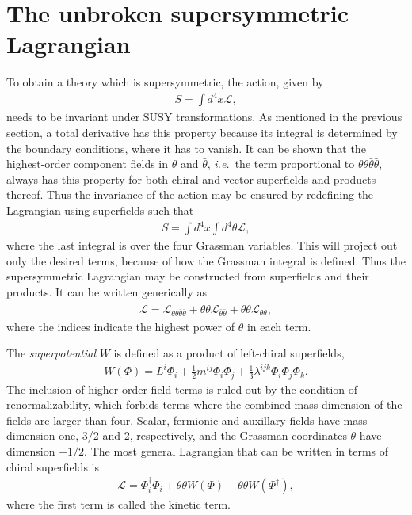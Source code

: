 \documentclass[twoside,english]{uiofysmaster}
\begin{document}
\section{The unbroken supersymmetric Lagrangian}
\label{sec:unbroken_susy}
To obtain a theory which is supersymmetric, the action, given by
\begin{align}
 	S = \int d^4 x \mathcal{L},
 \end{align}
 needs to be invariant under SUSY transformations. As mentioned in the previous section, a total derivative has this property because its integral is determined by the boundary conditions, where it has to vanish. It can be shown that the highest-order component fields in $\theta$ and $\bar \theta$, {\it i.e.}\ the term proportional to $\theta\theta\bar\theta\bar\theta$, always has this property for both chiral and vector superfields and products thereof. Thus the invariance of the action may be ensured by redefining the Lagrangian using superfields such that
 \begin{align}
 	S = \int d^4 x \int d^4 \theta \mathcal{L},
 \end{align}
 where the last integral is over the four Grassman variables. This will project out only the desired terms, because of how the Grassman integral is defined. Thus the supersymmetric Lagrangian may be constructed from superfields and their products. It can be written generically as
 \begin{align}
 	\mathcal{L} = \mathcal{L}_{\theta\theta \bar\theta \bar\theta} + \theta \theta \mathcal{L}_{\bar\theta \bar\theta} + \bar\theta \bar\theta \mathcal{L}_{\theta \theta},
 \end{align}
 where the indices indicate the highest power of $\theta$ in each term.

The {\it superpotential} $W$ is defined as a product of left-chiral superfields,
 \begin{align}
 	W(\Phi) = L^i\Phi_i + \frac{1}{2}m^{ij}\Phi_i\Phi_j + \frac{1}{3}\lambda^{ijk}\Phi_i\Phi_j\Phi_k.
 \end{align}
The inclusion of higher-order field terms is ruled out by the condition of renormalizability, which forbids terms where the combined mass dimension of the fields are larger than four. Scalar, fermionic and auxillary fields have mass dimension one, 3/2 and 2, respectively, and the Grassman coordinates $\theta$ have dimension $-1/2$. The most general Lagrangian that can be written in terms of chiral superfields is
\begin{align}
	\mathcal{L} = \Phi_i^\dag \Phi_i + \bar\theta\bar\theta W(\Phi) + \theta\theta W(\Phi^\dag),
\end{align}
where the first term is called the kinetic term. 
\end{document}
